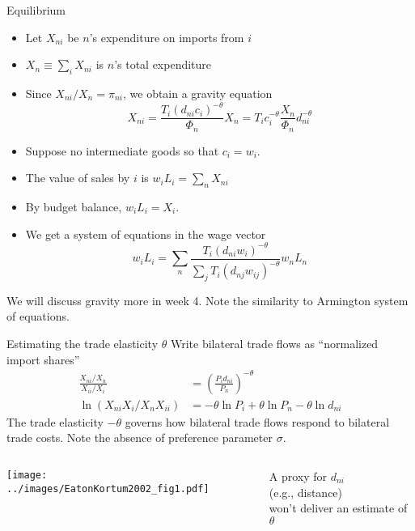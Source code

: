 \documentclass[10pt,notes=hide]{beamer}
\begin{document}
\begin{frame}{Equilibrium}
\begin{itemize}
	\item Let $X_{ni}$ be $n$'s expenditure on imports from $i$
	\item $X_n \equiv \sum_{i} X_{ni}$ is $n$'s total expenditure
	\item Since $X_{ni} / X_n = \pi_{ni}$, we obtain a gravity equation
	\begin{equation*} 
	X_{ni} 
	= \frac{T_{i}\left( d _{ni}c_{i}\right) ^{-\theta}}{\Phi_n} X_n 
	= T_{i}c_{i}^{-\theta} \frac{X_n}{\Phi_n} d_{ni}^{-\theta} 
	\end{equation*}
	\item Suppose no intermediate goods so that $c_i = w_i$.
	\item The value of sales by $i$ is $w_i L_i = \sum_{n} X_{ni}$
	\item By budget balance, $w_i L_i = X_i$.
	\item We get a system of equations in the wage vector
		\begin{equation*}w_i L_i = \sum_n \frac{T_{i}\left( d _{ni}w_{i}\right) ^{-\theta}}{\sum _j T_{i}\left( d _{nj}w_{ij}\right) ^{-\theta}} w_n L_n
		\end{equation*}
\end{itemize}
We will discuss gravity more in week 4. Note the similarity to Armington system of equations.
\end{frame}
\begin{frame}{Estimating the trade elasticity $\theta$}
Write bilateral trade flows as ``normalized import shares''
\begin{align*}
\frac{X_{ni}/X_{n}}{X_{ii}/X_{i}} 
&=
\left( \frac{P_{i}d_{ni}}{P_{n}}\right) ^{-\theta} \\
\ln \left(X_{ni}X_{i}/X_{n} X_{ii} \right)
&=
-\theta \ln P_{i}+\theta \ln P_{n}-\theta \ln d_{ni}
\end{align*}
The trade elasticity $-\theta$ governs how bilateral trade flows respond to bilateral trade costs.
Note the absence of preference parameter $\sigma$.
\begin{columns}
\begin{column}{.68\textwidth}
\texttt{[image: ../images/EatonKortum2002\_fig1.pdf]}
\end{column}
\begin{column}{.3\textwidth}
A proxy for $d_{ni}$ \\(e.g., distance) \\ won't deliver an estimate of $\theta$
\end{column}
\end{columns}
\end{frame}
\end{document}
